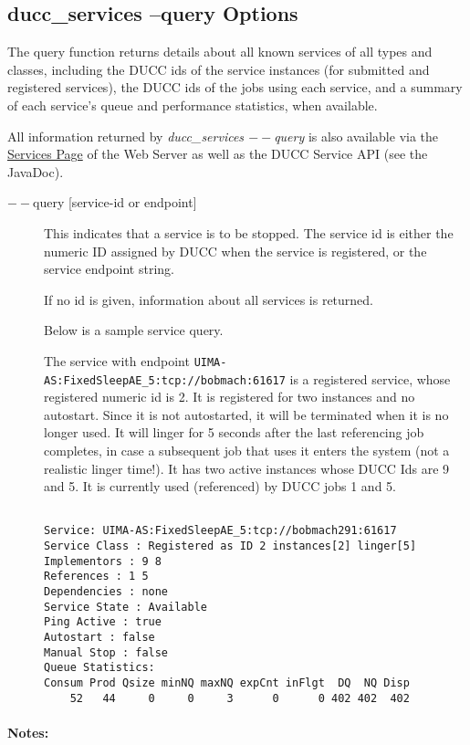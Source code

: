     \subsection{ducc\_services --query Options}
    The query function returns details about all known services of all types and classes, including 
    the DUCC ids of the service instances (for submitted and registered services), the DUCC ids of 
    the jobs using each service, and a summary of each service's queue and performance statistics, 
    when available. 
    
    All information returned by {\em ducc\_services $--$query} is also available via the
    \hyperref[ws:services-page]{Services Page} of the Web Server as well as the DUCC Service API (see 
    the JavaDoc).

    \begin{description}
    \item[$--$query {[service-id or endpoint]}] This indicates that a service is to be stopped. The
      service id is either the numeric ID assigned by DUCC when the service is registered, or the
      service endpoint string.

      If no id is given, information about all services is returned. 

      Below is a sample service query.

      The service with endpoint {\tt UIMA-AS:FixedSleepAE\_5:tcp://bobmach:61617} is a 
      registered service, whose registered numeric id is 2. It is registered for two instances and 
      no autostart. Since it is not autostarted, it will be terminated when it is no longer used. It 
      will linger for 5 seconds after the last referencing job completes, in case a subsequent job 
      that uses it enters the system (not a realistic linger time!). It has two active
      instances whose DUCC Ids are 9 and 5. It is currently used (referenced) 
      by DUCC jobs 1 and 5. 


\begin{verbatim}

Service: UIMA-AS:FixedSleepAE_5:tcp://bobmach291:61617 
Service Class : Registered as ID 2 instances[2] linger[5] 
Implementors : 9 8 
References : 1 5 
Dependencies : none 
Service State : Available 
Ping Active : true 
Autostart : false 
Manual Stop : false 
Queue Statistics: 
Consum Prod Qsize minNQ maxNQ expCnt inFlgt  DQ  NQ Disp 
    52   44     0     0     3      0      0 402 402  402 
\end{verbatim}
    \end{description}
    \paragraph{Notes:}

